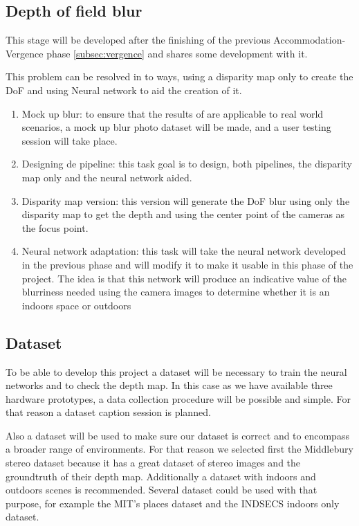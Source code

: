\documentclass[10pt,a4paper,twocolumn,twoside]{article}
\begin{document}
\subsection{Depth of field blur}
This stage will be developed after the finishing of the previous Accommodation-Vergence phase \ref{subsec:vergence} and shares some development with it. 

This problem can be resolved in to ways, using a disparity map only to create the DoF and using Neural network to aid the creation of it.

\begin{enumerate}
	\item Mock up blur: to ensure that the results of \cite{ifftConfortDoF} are applicable to real world scenarios, a mock up blur photo dataset will be made, and a user testing session will take place.
	
	\item Designing de pipeline: this task goal is to design, both pipelines, the disparity map only and the neural network aided.
	
	\item Disparity map version: this version will generate the DoF blur using only the disparity map to get the depth and using the center point of the cameras as the focus point.
	
	\item Neural network adaptation: this task will take the neural network developed in the previous phase and will modify it to make it usable in this phase of the project. The idea is that this network will produce an indicative value of the blurriness needed using the camera images to determine whether it is an indoors space or outdoors 
\end{enumerate}

\subsection{Dataset}
To be able to develop this project a dataset will be necessary to train the neural networks and to check the depth map. In this case as we have available three hardware prototypes, a data collection procedure will be possible and simple. For that reason a dataset caption session is planned.

Also a dataset will be used to make sure our dataset is correct and to encompass a broader range of environments. For that reason we selected first the Middlebury stereo dataset\cite{middelburyDataset} because it has a great dataset of stereo images and the groundtruth of their depth map. Additionally a dataset with indoors and outdoors scenes is recommended. Several dataset could be used with that purpose, for example the MIT's places dataset\cite{mitplaces} and the INDSECS indoors only dataset\cite{indecs}.
\end{document}

